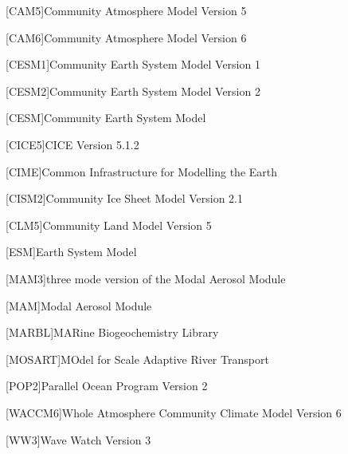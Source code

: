 \begin{acronym}[AODVISstdn]
  [CAM5]{Community Atmosphere Model Version 5}

  [CAM6]{Community Atmosphere Model Version 6}

  [CESM1]{Community Earth System Model Version 1}

  [CESM2]{Community Earth System Model Version 2}

  [CESM]{Community Earth System Model}

  [CICE5]{CICE Version 5.1.2}

  [CIME]{Common Infrastructure for Modelling the Earth}

  [CISM2]{Community Ice Sheet Model Version 2.1}

  [CLM5]{Community Land Model Version 5}

  [ESM]{Earth System Model}

  [MAM3]{three mode version of the Modal Aerosol Module}

  [MAM]{Modal Aerosol Module}

  [MARBL]{MARine Biogeochemistry Library}

  [MOSART]{MOdel for Scale Adaptive River Transport}

  [POP2]{Parallel Ocean Program Version 2}

  [WACCM6]{Whole Atmosphere Community Climate Model Version 6}

  [WW3]{Wave Watch Version 3}

\end{acronym}
